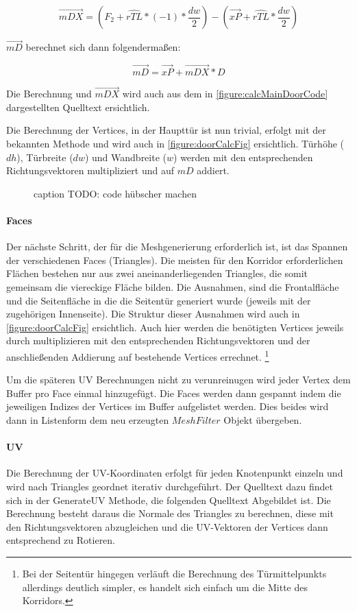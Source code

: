 $$ \vec{mDX} = (F_2 + \hat{rTL} * (-1) * \frac{dw}{2}) -
(\vec{xP} + \hat{rTL} * \frac{dw}{2})$$

$\vec{mD}$ berechnet sich dann folgendermaßen:

$$ \vec{mD} = \vec{xP} + \vec{mDX} * D$$

Die Berechnung und $\vec{mDX}$ wird auch aus dem in \autoref{figure:calcMainDoorCode}
dargestellten Quelltext ersichtlich. %

Die Berechnung der Vertices, in der Haupttür ist nun trivial, erfolgt mit der bekannten Methode und wird auch in \autoref{figure:doorCalcFig} ersichtlich. Türhöhe ($dh$), Türbreite ($dw$) und Wandbreite ($w$) werden mit den entsprechenden Richtungsvektoren multipliziert und auf $mD$ addiert.

\begin{figure}[H]
    \centering
    \caption{caption TODO: code hübscher machen} %
    \label{figure:calcMainDoorCode}
\end{figure}

\paragraph*{Faces}
Der nächste Schritt, der für die Meshgenerierung erforderlich ist, ist das Spannen der verschiedenen Faces (Triangles). Die meisten für den Korridor erforderlichen Flächen bestehen nur aus zwei aneinanderliegenden Triangles, die somit gemeinsam die viereckige Fläche bilden. Die Ausnahmen, sind die Frontalfläche und die Seitenfläche in die die Seitentür generiert wurde (jeweils mit der zugehörigen Innenseite). Die Struktur dieser Ausnahmen wird auch in \autoref{figure:doorCalcFig} ersichtlich.
Auch hier werden die benötigten Vertices jeweils durch multiplizieren mit den entsprechenden Richtungsvektoren und der anschließenden Addierung auf bestehende Vertices errechnet. \footnote{Bei der Seitentür hingegen verläuft die Berechnung des Türmittelpunkts allerdings deutlich simpler, es handelt sich einfach um die Mitte des Korridors.}

Um die späteren UV Berechnungen nicht zu verunreinugen wird jeder Vertex dem Buffer pro Face einmal hinzugefügt. Die Faces werden dann gespannt indem die jeweiligen Indizes der Vertices im Buffer aufgelistet werden. Dies beides wird dann in Listenform dem neu erzeugten $MeshFilter$ Objekt übergeben.

\paragraph*{UV}
Die Berechnung der UV-Koordinaten erfolgt für jeden Knotenpunkt einzeln und wird nach Triangles geordnet iterativ durchgeführt. Der Quelltext dazu findet sich in der GenerateUV Methode, die folgenden Quelltext Abgebildet ist.
Die Berechnung besteht daraus die Normale des Triangles zu berechnen, diese mit den Richtungsvektoren abzugleichen und die UV-Vektoren der Vertices dann entsprechend zu Rotieren.

